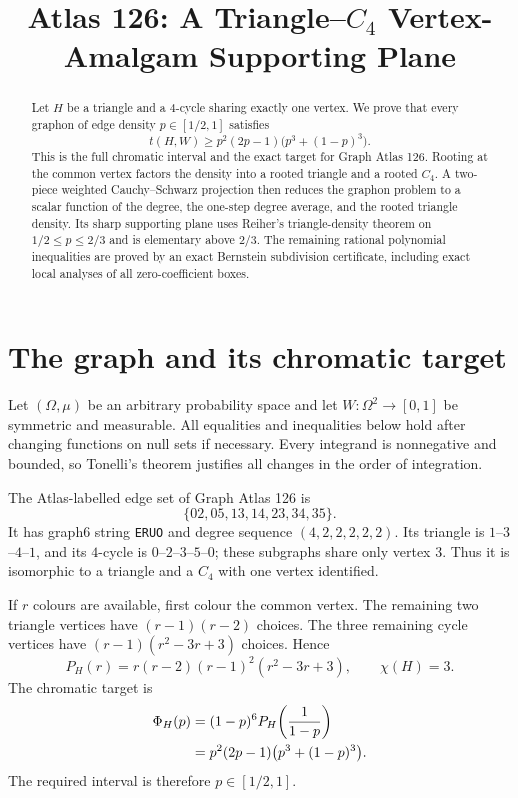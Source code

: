 \documentclass[11pt]{article}
\title{Atlas 126: A Triangle--$C_4$ Vertex-Amalgam Supporting Plane}
\author{}
\date{}
\newcommand{\PhiH}{\Phi_H}
\begin{document}
\maketitle

\begin{abstract}
Let $H$ be a triangle and a $4$-cycle sharing exactly one vertex.  We prove
that every graphon of edge density $p\in[1/2,1]$ satisfies
\[
 t(H,W)\ge p^2(2p-1)\bigl(p^3+(1-p)^3\bigr).
\]
This is the full chromatic interval and the exact target for Graph Atlas 126.
Rooting at the common vertex factors the density into a rooted triangle and a
rooted $C_4$.  A two-piece weighted Cauchy--Schwarz projection then reduces
the graphon problem to a scalar function of the degree, the one-step degree
average, and the rooted triangle density.  Its sharp supporting plane uses
Reiher's triangle-density theorem on $1/2\le p\le2/3$ and is elementary above
$2/3$.  The remaining rational polynomial inequalities are proved by an
exact Bernstein subdivision certificate, including exact local analyses of
all zero-coefficient boxes.
\end{abstract}

\section{The graph and its chromatic target}

Let $(\Omega,\mu)$ be an arbitrary probability space and let
$W\colon\Omega^2\to[0,1]$ be symmetric and measurable.  All equalities and
inequalities below hold after changing functions on null sets if necessary.
Every integrand is nonnegative and bounded, so Tonelli's theorem justifies
all changes in the order of integration.

The Atlas-labelled edge set of Graph Atlas 126 is
\[
 \{02,05,13,14,23,34,35\}.
\]
It has graph6 string \texttt{ERUO} and degree sequence
$(4,2,2,2,2,2)$.  Its triangle is $1$--$3$--$4$--$1$, and its $4$-cycle is
$0$--$2$--$3$--$5$--$0$; these subgraphs share only vertex $3$.
Thus it is isomorphic to a triangle and a $C_4$ with one vertex identified.

If $r$ colours are available, first colour the common vertex.  The remaining
two triangle vertices have $(r-1)(r-2)$ choices.  The three remaining cycle
vertices have $(r-1)(r^2-3r+3)$ choices.  Hence
\begin{equation}
 P_H(r)=r(r-2)(r-1)^2(r^2-3r+3),\qquad \chi(H)=3.
 \label{eq:chromatic}
\end{equation}
The chromatic target is
\begin{align}
 \PhiH(p)
 &=(1-p)^6P_H\!\left(\frac1{1-p}\right)\notag\\
 &=p^2(2p-1)\bigl(p^3+(1-p)^3\bigr).
 \label{eq:target}
\end{align}
The required interval is therefore $p\in[1/2,1]$.
\end{document}
